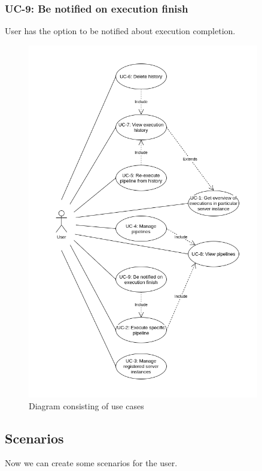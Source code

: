 \subsubsection*{UC-9: Be notified on execution finish}
User has the option to be notified about execution completion.

\begin{figure}\centering
	\includegraphics[width=0.9\textwidth]{pics/bc-uc.png}
	\caption[Use cases]{Diagram consisting of use cases}\label{fig:uc}
\end{figure}


\subsection{Scenarios}
Now we can create some scenarios for the user.

